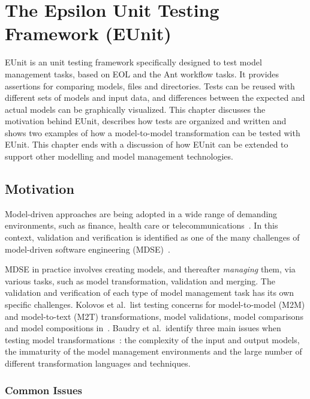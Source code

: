 \clearpage
\chapter{The Epsilon Unit Testing Framework (EUnit)}
\label{chp:eunit}

\lstset{%
  basicstyle=\ttfamily\footnotesize,%
  columns=flexible,%
  tabsize=2,%
}

EUnit is an unit testing framework specifically designed to test model management tasks, based on EOL and the Ant workflow tasks. It provides assertions for comparing models, files and directories. Tests can be reused with different sets of models and input data, and differences between the expected and actual models can be graphically visualized. This chapter discusses the motivation behind EUnit, describes how tests are organized and written and shows two examples of how a model-to-model transformation can be tested with EUnit. This chapter ends with a discussion of how EUnit can be extended to support other modelling and model management technologies.

\section{Motivation}
\label{sec:eunit-motiv-test-model}

Model-driven approaches are being adopted in a wide range of demanding environments, such as finance, health care or telecommunications~\cite{Guttman2006}. In this context, validation and verification is identified as one of the many challenges of model-driven software engineering (MDSE)~\cite{Chaudron2009}.

MDSE in practice involves creating models, and thereafter \textit{managing} them, via various tasks, such as model transformation, validation and merging.  The validation and verification of each type of model management task has its own specific challenges. Kolovos et al.\ list testing concerns for model-to-model (M2M) and model-to-text (M2T) transformations, model validations, model comparisons and model compositions in~\cite{EUnit}. Baudry et al.\ identify three main issues when testing model transformations~\cite{Baudry2010}: the complexity of the input and output models, the immaturity of the model management environments and the large number of different transformation languages and techniques.

\subsection{Common Issues}
\label{sec:eunit-common-issues}

